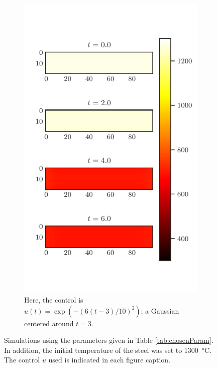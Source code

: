 \begin{figure}
{\begin{subfigure}[t]{3in}
        \includegraphics{figures/gaussian_u_state.pdf}
        \caption{Here, the control is $u(t) = \exp{\left(-\left(6(t-3)/10\right)^2\right)}$; a Gaussian centered around $t=3$.}
        \label{fig:state_simulations_b}
    \end{subfigure}
    }
    \caption{Simulations using the parameters given in Table \ref{tab:chosenParam}. In addition, the initial temperature of the steel was set to \SI{1300}{\celsius}. The control $u$ used is indicated in each figure caption.}
    \label{fig:state_simulations}
\end{figure}
